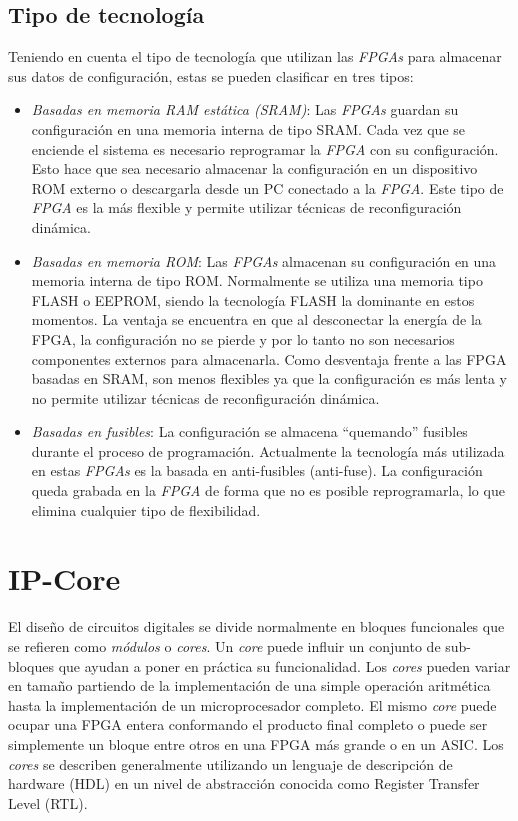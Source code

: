 \subsection{Tipo de tecnología} 

Teniendo en cuenta el tipo de tecnología que utilizan las
\textit{FPGAs} para almacenar sus datos de configuración, estas se
pueden clasificar en tres tipos:

\begin{itemize}
\item \textit {Basadas en memoria RAM estática (SRAM)}: Las
  \textit{FPGAs} guardan su configuración en una memoria interna de
  tipo SRAM. Cada vez que se enciende el sistema es necesario
  reprogramar la \textit{FPGA} con su configuración. Esto hace que sea
  necesario almacenar la configuración en un dispositivo ROM externo o
  descargarla desde un PC conectado a la \textit{FPGA}. Este tipo de
  \textit{FPGA} es la más flexible y permite utilizar técnicas de
  reconfiguración dinámica.
\item \textit{Basadas en memoria ROM}: Las \textit{FPGAs} almacenan su
  configuración en una memoria interna de tipo ROM. Normalmente se
  utiliza una memoria tipo FLASH o EEPROM, siendo la tecnología FLASH
  la dominante en estos momentos. La ventaja se encuentra en que al
  desconectar la energía de la FPGA, la configuración no se pierde y
  por lo tanto no son necesarios componentes externos para
  almacenarla. Como desventaja frente a las FPGA basadas en SRAM, son
  menos flexibles ya que la configuración es más lenta y no permite
  utilizar técnicas de reconfiguración dinámica.
\item \textit{Basadas en fusibles}: La configuración se almacena
  “quemando” fusibles durante el proceso de programación. Actualmente
  la tecnología más utilizada en estas \textit{FPGAs} es la basada en
  anti-fusibles (anti-fuse). La configuración queda grabada en la
  \textit{FPGA} de forma que no es posible reprogramarla, lo que
  elimina cualquier tipo de flexibilidad.
\end{itemize}


\section{IP-Core}
El diseño de circuitos digitales se divide normalmente en bloques
funcionales que se refieren como \textit{módulos} o \textit{cores}. Un
\textit{core} puede influir un conjunto de sub-bloques que ayudan a
poner en práctica su funcionalidad. Los \textit{cores} pueden variar
en tamaño partiendo de la implementación de una simple operación
aritmética hasta la implementación de un microprocesador completo. El
mismo \textit{core} puede ocupar una FPGA entera conformando el
producto final completo o puede ser simplemente un bloque entre otros
en una FPGA más grande o en un ASIC. Los \textit{cores} se describen
generalmente utilizando un lenguaje de descripción de hardware (HDL)
en un nivel de abstracción conocida como Register Transfer Level
(RTL).
	
